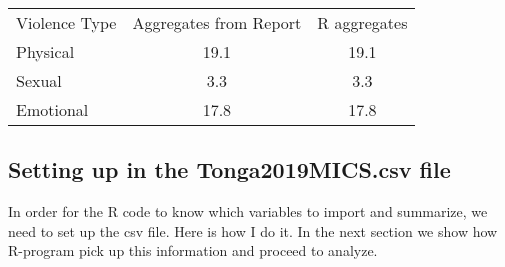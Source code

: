 \documentclass[12pt]{article}
\begin{document}
\begin{tabular}{l|c|c}
	\hline
	Violence Type & Aggregates from Report & R aggregates \\
	Physical & 19.1 &  19.1 \\
	Sexual & 3.3 & 3.3 \\
	Emotional & 17.8 & 17.8 \\
	\hline
\end{tabular}

\subsection{Setting up in the Tonga2019MICS.csv file}	

In order for the R code to know which variables to import and summarize, we need to set up the csv file. Here is how I do it. In the next section we show how R-program pick up this information and proceed to analyze.
\end{document}
